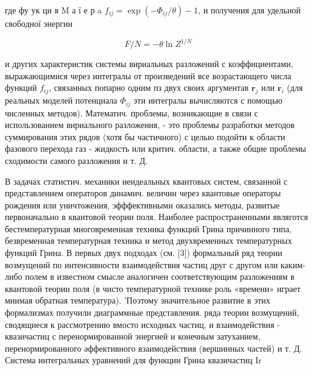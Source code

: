 \documentclass[10pt]{article}
\begin{document}
где фу ук ци я $\mathrm{M}$ а ї е р a $f_{i j}=\exp \left(-\Phi_{i j} / \theta\right)-1$, и получения для удельной свободної энергии



\[

F / N=-\theta \ln Z^{1 / N}

\]



и других характеристик системы вириальных разложений с коэффициентами, выражающимися через интегралы от произведений все возрастающего числа функций $f_{i j}$, связанных попарно одним пз двух своих аргументав $\boldsymbol{r}_{j}$ или $\boldsymbol{r}_{i}$ (для реальных моделей потенциала $\Phi_{i j}$ эти интегралы вычисляются с помощью численных методов). Математич. проблемы, возникающие в связи с использованием вириального разложения, - это проблемы разработки методов суммирования этих рядов (хотя бы частичного) с целью подойти к области фазового перехода газ - жидкость или критич. области, а также общие проблемы сходимости самого разложения и т. Д.



В задачах статистич. механики неидеальных квантовых систем, связанной с представлением операторов динамич. величин через квантовые операторы рождения или уничтожения, эфффективными оказались методы, развитые первоначально в квантовой теории поля. Наиболее распространенными являготся бестемпературная многовременная техника функций Грина причинного типа, безвременная температурная техника и метод двухвременных температурных функций Грина. В первых двух подходах (см. [3]) формальный ряд теории возмущений по интенсивности взаимодействия частиц друг с другом или каким-либо полем в известном смысле аналогичен соответствующим разложениям в квантовой теории поля (в чисто температурной технике роль «времени» играет мнимая обратная температура). 'Поэтому значительное развитие в этих формализмах получили диаграммные представления. ряда теории возмущений, сводящиеся к рассмотрению вмосто исходных частиц, и взаимодействия - квазичастиц с перенормированной энергией и конечным затуханием, перенормированного әффективного взаимодействия (вершинных частей) и т. Д. Система интегральных уравнений для функции Грина квазичастиц Ir
\end{document}
